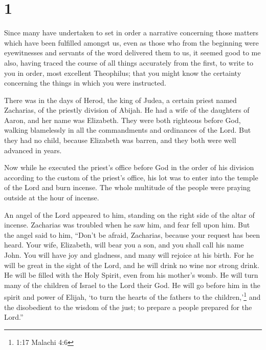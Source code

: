 \hypertarget{section}{%
\section{1}\label{section}}

 Since many have undertaken to set in order a narrative
concerning those matters which have been fulfilled amongst us,
 even as those who from the beginning were eyewitnesses and
servants of the word delivered them to us,  it seemed good
to me also, having traced the course of all things accurately from the
first, to write to you in order, most excellent Theophilus; 
that you might know the certainty concerning the things in which you
were instructed.

 There was in the days of Herod, the king of Judea, a
certain priest named Zacharias, of the priestly division of Abijah. He
had a wife of the daughters of Aaron, and her name was Elizabeth.
 They were both righteous before God, walking blamelessly in
all the commandments and ordinances of the Lord.  But they
had no child, because Elizabeth was barren, and they both were well
advanced in years.

 Now while he executed the priest's office before God in the
order of his division  according to the custom of the
priest's office, his lot was to enter into the temple of the Lord and
burn incense.  The whole multitude of the people were
praying outside at the hour of incense.

 An angel of the Lord appeared to him, standing on the
right side of the altar of incense.  Zacharias was troubled
when he saw him, and fear fell upon him.  But the angel
said to him, ``Don't be afraid, Zacharias, because your request has been
heard. Your wife, Elizabeth, will bear you a son, and you shall call his
name John.  You will have joy and gladness, and many will
rejoice at his birth.  For he will be great in the sight of
the Lord, and he will drink no wine nor strong drink. He will be filled
with the Holy Spirit, even from his mother's womb.  He will
turn many of the children of Israel to the Lord their God. 
He will go before him in the spirit and power of Elijah, `to turn the
hearts of the fathers to the children,'\footnote{1:17 Malachi 4:6} and
the disobedient to the wisdom of the just; to prepare a people prepared
for the Lord.''

